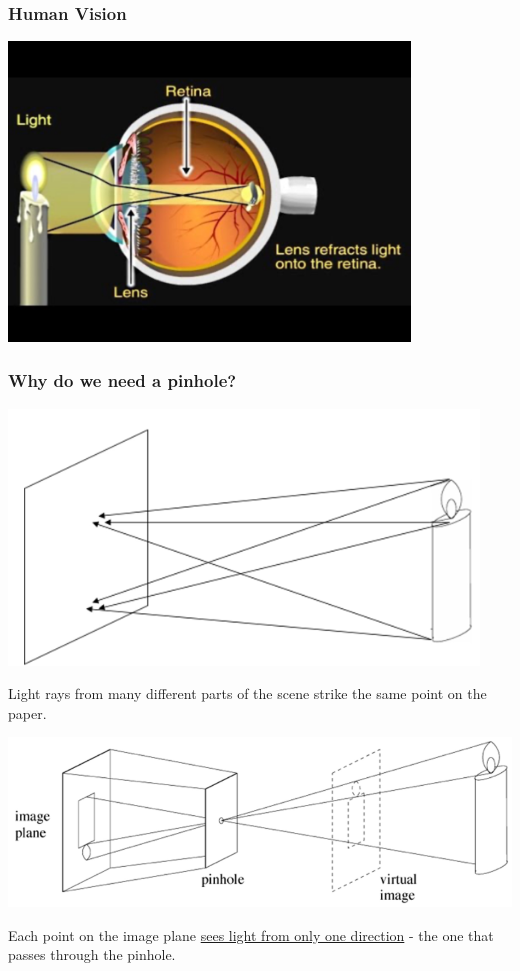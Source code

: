 \documentclass[10pt]{article}
\begin{document}
\subsubsection*{Human Vision}
\begin{center} 
	\includegraphics*[width=0.8\textwidth]{L1_9.png} 
\end{center}
\subsubsection*{Why do we need a pinhole?}
\begin{center} 
	\includegraphics*[width=\textwidth]{L1_10.png} 
\end{center}
Light rays from many different parts of the scene strike the same point on the paper.
\begin{center} 
	\includegraphics*[width=\textwidth]{L1_11.png} 
\end{center}
Each point on the image plane \underline{sees light from only one direction} - the one that passes through the pinhole.
\end{document}
